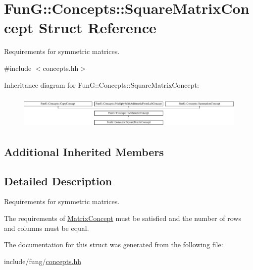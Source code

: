 \hypertarget{structFunG_1_1Concepts_1_1SquareMatrixConcept}{}\section{FunG\+:\+:Concepts\+:\+:Square\+Matrix\+Concept Struct Reference}
\label{structFunG_1_1Concepts_1_1SquareMatrixConcept}


Requirements for symmetric matrices.  




{\ttfamily \#include $<$concepts.\+hh$>$}

Inheritance diagram for FunG\+:\+:Concepts\+:\+:Square\+Matrix\+Concept\+:\begin{figure}[H]
\begin{center}
\leavevmode
\includegraphics[height=1.661721cm]{structFunG_1_1Concepts_1_1SquareMatrixConcept}
\end{center}
\end{figure}
\subsection*{Additional Inherited Members}


\subsection{Detailed Description}
Requirements for symmetric matrices. 

The requirements of \hyperlink{structFunG_1_1Concepts_1_1MatrixConcept}{Matrix\+Concept} must be satisfied and the number of rows and columns must be equal. 

The documentation for this struct was generated from the following file\+:\begin{DoxyCompactItemize}
\item 
include/fung/\hyperlink{concepts_8hh}{concepts.\+hh}\end{DoxyCompactItemize}
